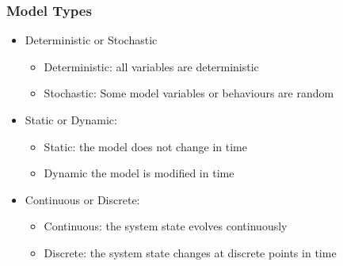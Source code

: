 \subsubsection{Model Types}
\begin{itemize}
	\item Deterministic or Stochastic
	\begin{itemize}
		\item Deterministic: all variables are deterministic
		\item Stochastic: Some model variables or behaviours are
			random
	\end{itemize}
	\item Static or Dynamic:
	\begin{itemize}
		\item Static: the model does not change in time
		\item Dynamic the model is modified in time
	\end{itemize}
	\item Continuous or Discrete:
	\begin{itemize}
		\item Continuous: the system state evolves continuously
		\item Discrete: the system state changes at discrete points in
		time
	\end{itemize}
\end{itemize}

